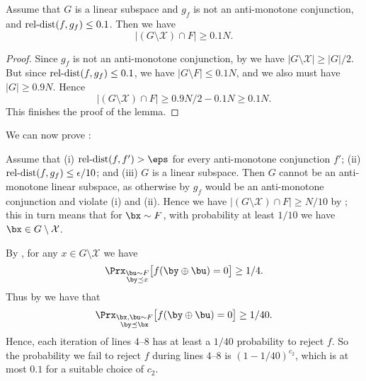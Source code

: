 \documentclass[11pt]{article}
\theoremstyle{definition}
\begin{document}
\begin{lemma}\label{lem: f cap g is large}
   Assume that $G$ is a linear subspace and $g_f$ is not an anti-monotone conjunction, and $\mathrm{rel}\text{-}\mathrm{dist}(f,g_f) \leq 0.1$. Then we have$$\left|\left(G \setminus \mathcal{X}\right) \cap F\right| \geq 0.1N.$$
\end{lemma}
\begin{proof}
Since $g_f$ is not an anti-monotone conjunction, by  we have $\left|G \setminus \mathcal{X}\right| \geq \left|G\right|/2$. But since $\mathrm{rel}\text{-}\mathrm{dist}(f,g_f) \leq 0.1 $, we have $|G \setminus F|\le 0.1N$, and we also must have $|G| \geq 0.9N$. Hence  
$$\left|\left(G \setminus \mathcal{X}\right) \cap F\right| \geq 0.9N/2 - 0.1N \geq 0.1N.  $$ 
This finishes the proof of the lemma.
\end{proof}

We can now prove :

\begin{proofof}{}
    Assume that (i) $\reldist(f,f') > \eps$  for every anti-monotone conjunction $f'$; (ii) $\mathrm{rel}\text{-}\mathrm{dist}(f,g_f) \leq \epsilon/10$; and (iii) $G$ is a linear subspace. Then $G$ cannot be an anti-monotone linear subspace, as otherwise by  $g_f$ would be an anti-monotone conjunction and violate (i) and (ii).
    Hence we have $|(G \setminus \mathcal{X} ) \cap F | \geq N/10$ by ; this in turn means that for $\bx \sim F$, with probability at least $1/10$ we have $\bx \in G \setminus \mathcal{X}$. 


    By , for any $x \in G \setminus \mathcal{X}$ we have 
$$\Prx_{\substack{ \bu \sim F \\ \by \preceq x}}\big[f(\by \oplus \bu )=0\big] \geq 1/4.$$
Thus by  we have that
$$\Prx_{\substack{\bx,\bu \sim F \\ \by \preceq \bx  }}\big[f(\by \oplus \bu )=0\big] \geq 1/40.$$
Hence, each iteration of lines $4$--$8$ has at least a  $1/40$ probability to reject $f$. So the probability we fail to reject $f$ during lines $4$--$8$ is $(1-1/40)^{c_2}$, which is
    at most $0.1$ for a suitable choice of $c_2$.
\end{proofof}
\end{document}
